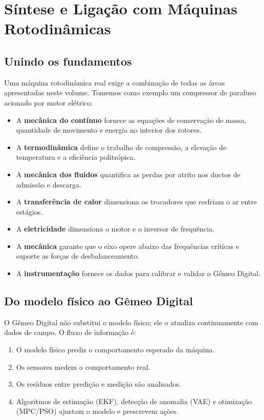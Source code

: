 \documentclass[12pt,a4paper]{article}
\numberwithin{equation}{section}
\numberwithin{table}{section}
\numberwithin{figure}{section}
\begin{document}
\section{Síntese e Ligação com Máquinas Rotodinâmicas}\label{sec:sintese}

\subsection{Unindo os fundamentos}

Uma máquina rotodinâmica real exige a combinação de todas as áreas apresentadas
neste volume. Tomemos como exemplo um compressor de parafuso acionado por motor
elétrico:

\begin{itemize}
\item A \textbf{mecânica do contínuo} fornece as equações de conservação de
  massa, quantidade de movimento e energia no interior dos rotores.
\item A \textbf{termodinâmica} define o trabalho de compressão, a elevação de
  temperatura e a eficiência politrópica.
\item A \textbf{mecânica dos fluidos} quantifica as perdas por atrito nos
  ductos de admissão e descarga.
\item A \textbf{transferência de calor} dimensiona os trocadores que
  resfriam o ar entre estágios.
\item A \textbf{eletricidade} dimensiona o motor e o inversor de frequência.
\item A \textbf{mecânica} garante que o eixo opere abaixo das frequências
  críticas e suporte as forças de desbalanceamento.
\item A \textbf{instrumentação} fornece os dados para calibrar e validar o
  Gêmeo Digital.
\end{itemize}

\subsection{Do modelo físico ao Gêmeo Digital}

O Gêmeo Digital não substitui o modelo físico; ele o atualiza continuamente
com dados de campo. O fluxo de informação é:
\begin{enumerate}
\item O modelo físico prediz o comportamento esperado da máquina.
\item Os sensores medem o comportamento real.
\item Os resíduos entre predição e medição são analisados.
\item Algoritmos de estimação (EKF), detecção de anomalia (VAE) e otimização
  (MPC/\-PSO) ajustam o modelo e prescrevem ações.
\end{enumerate}
\end{document}
